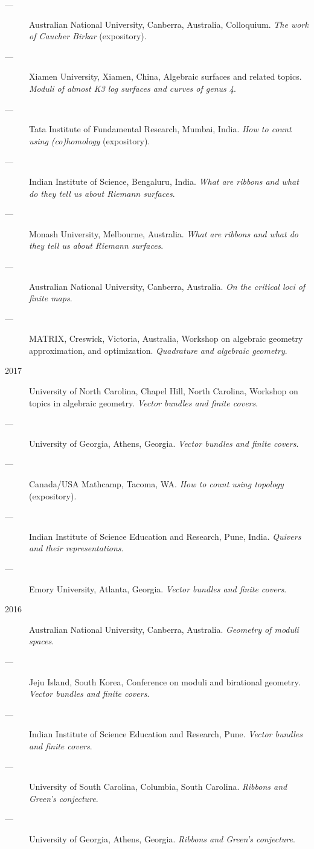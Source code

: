 \documentclass[11pt]{article}
\begin{document}
\begin{description}
\item[{---}] Australian National University, Canberra, Australia, Colloquium. \emph{The work of Caucher Birkar} (expository).
\item[{---}] Xiamen University, Xiamen, China, Algebraic surfaces and related topics. \emph{Moduli of almost K3 log surfaces and curves of genus 4}.
\item[{---}] Tata Institute of Fundamental Research, Mumbai, India. \emph{How to count using (co)homology} (expository).
\item[{---}] Indian Institute of Science, Bengaluru, India. \emph{What are ribbons and what do they tell us about Riemann surfaces}.
\item[{---}] Monash University, Melbourne, Australia. \emph{What are ribbons and what do they tell us about Riemann surfaces}.
\item[{---}] Australian National University, Canberra, Australia. \emph{On the critical loci of finite maps}.
\item[{---}] MATRIX, Creswick, Victoria, Australia, Workshop on algebraic geometry approximation, and optimization. \emph{Quadrature and algebraic geometry}.
\item[{2017}] University of North Carolina, Chapel Hill, North Carolina, Workshop on topics in algebraic geometry. \emph{Vector bundles and finite covers}.
\item[{---}] University of Georgia, Athens, Georgia. \emph{Vector bundles and finite covers}.
\item[{---}] Canada/USA Mathcamp, Tacoma, WA. \emph{How to count using topology} (expository).
\item[{---}] Indian Institute of Science Education and Research, Pune, India. \emph{Quivers and their representations}.
\item[{---}] Emory University, Atlanta, Georgia. \emph{Vector bundles and finite covers}.
\item[{2016}] Australian National University, Canberra, Australia. \emph{Geometry of moduli spaces}.
\item[{---}] Jeju Island, South Korea, Conference on moduli and birational geometry. \emph{Vector bundles and finite covers}.
\item[{---}] Indian Institute of Science Education and Research, Pune. \emph{Vector bundles and finite covers}.
\item[{---}] University of South Carolina, Columbia, South Carolina. \emph{Ribbons and Green's conjecture}.
\item[{---}] University of Georgia, Athens, Georgia. \emph{Ribbons and Green's conjecture}.

\end{description}
\end{document}
